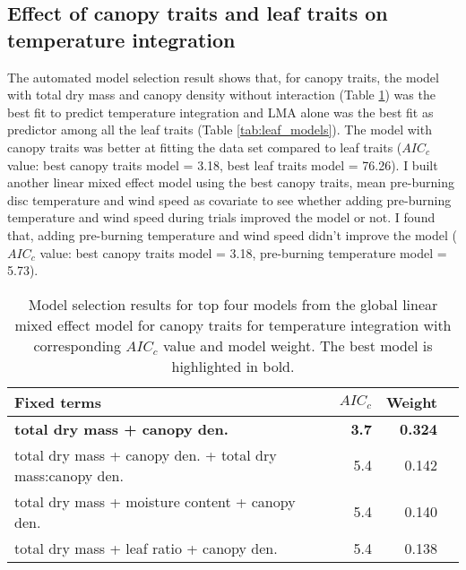 \documentclass{ttuthes2007}
\begin{document}

\subsection{Effect of canopy traits and leaf traits on temperature integration}

The automated model selection result shows that, for canopy traits, the model with total dry mass and canopy density without interaction (Table \ref{tab:canopy_models}) was the best fit to predict temperature integration and \MakeUppercase{lma} alone was the best fit as predictor among all the leaf traits (Table \ref{tab:leaf_models}). The model with canopy traits was better at fitting the data set compared to leaf traits ($AIC_{c}$ value: best canopy traits model = 3.18, best leaf traits model = 76.26). I built another linear mixed effect model using the best canopy traits, mean pre-burning disc temperature and wind speed as  covariate to see whether adding pre-burning temperature and wind speed during trials improved the model or not. I found that, adding pre-burning temperature and wind speed didn't improve the model ($AIC_{c}$ value: best canopy traits model = 3.18, pre-burning temperature model = 5.73).

\begin{table}
  \centering
  \caption{Model selection results for top four models from the global linear
    mixed effect model for canopy traits for temperature integration with
    corresponding $AIC_{c}$ value and model weight. The best model is highlighted in bold.}
  \begin{tabular}{lrrr}
    \toprule
    \textbf{Fixed terms} & \textbf{$AIC_{c}$} & \textbf{Weight}\\
    \midrule
    \textbf{total dry mass + canopy den.}    & \textbf{3.7} &  \textbf{0.324}\\
    total dry mass + canopy den. + total dry mass:canopy den. & 5.4  & 0.142 \\
    total dry mass + moisture content + canopy den.   & 5.4   & 0.140 \\ 
    total dry mass + leaf ratio + canopy den.  & 5.4 & 0.138  \\
    \bottomrule
  \end{tabular}
  \label{tab:canopy_models}
\end{table}
\end{document}
